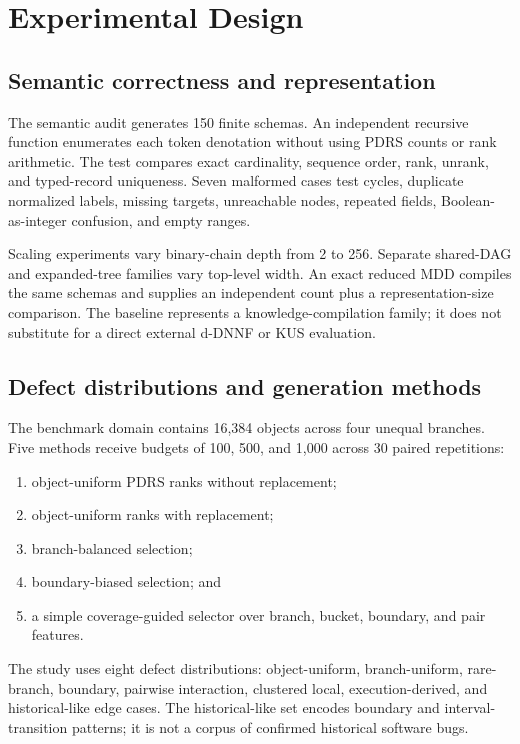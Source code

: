 \documentclass[10pt]{article}
\begin{document}
\section{Experimental Design}
\subsection{Semantic correctness and representation}
The semantic audit generates 150 finite schemas. An independent recursive function enumerates each token denotation without using PDRS counts or rank arithmetic. The test compares exact cardinality, sequence order, rank, unrank, and typed-record uniqueness. Seven malformed cases test cycles, duplicate normalized labels, missing targets, unreachable nodes, repeated fields, Boolean-as-integer confusion, and empty ranges.

Scaling experiments vary binary-chain depth from 2 to 256. Separate shared-DAG and expanded-tree families vary top-level width. An exact reduced MDD compiles the same schemas and supplies an independent count plus a representation-size comparison. The baseline represents a knowledge-compilation family; it does not substitute for a direct external d-DNNF or KUS evaluation.

\subsection{Defect distributions and generation methods}
The benchmark domain contains 16,384 objects across four unequal branches. Five methods receive budgets of 100, 500, and 1,000 across 30 paired repetitions:
\begin{enumerate}
  \item object-uniform PDRS ranks without replacement;
  \item object-uniform ranks with replacement;
  \item branch-balanced selection;
  \item boundary-biased selection; and
  \item a simple coverage-guided selector over branch, bucket, boundary, and pair features.
\end{enumerate}
The study uses eight defect distributions: object-uniform, branch-uniform, rare-branch, boundary, pairwise interaction, clustered local, execution-derived, and historical-like edge cases. The historical-like set encodes boundary and interval-transition patterns; it is not a corpus of confirmed historical software bugs.
\end{document}

